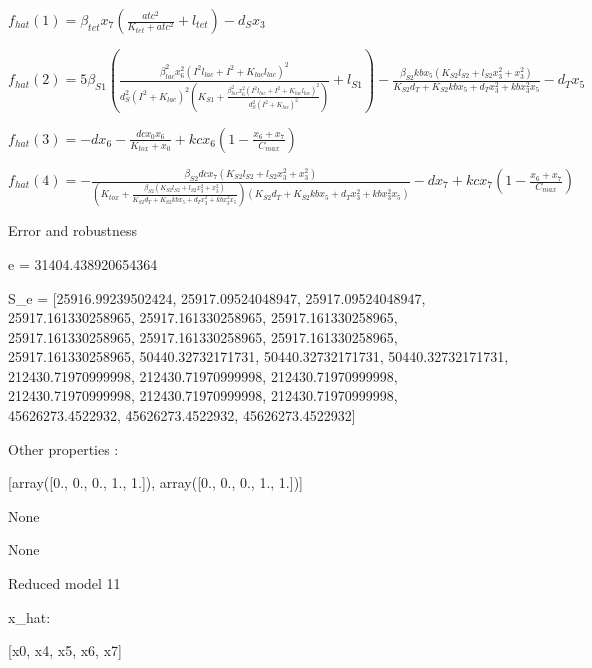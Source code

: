 $f_{hat}(1)=\beta_{tet} x_{7} \left(\frac{atc^{2}}{K_{tet} + atc^{2}} + l_{tet}\right) - d_{S} x_{3}$


$f_{hat}(2)=5 \beta_{S1} \left(\frac{\beta_{lac}^{2} x_{6}^{2} \left(I^{2} l_{lac} + I^{2} + K_{lac} l_{lac}\right)^{2}}{d_{S}^{2} \left(I^{2} + K_{lac}\right)^{2} \left(K_{S1} + \frac{\beta_{lac}^{2} x_{6}^{2} \left(I^{2} l_{lac} + I^{2} + K_{lac} l_{lac}\right)^{2}}{d_{S}^{2} \left(I^{2} + K_{lac}\right)^{2}}\right)} + l_{S1}\right) - \frac{\beta_{S2} kb x_{5} \left(K_{S2} l_{S2} + l_{S2} x_{3}^{2} + x_{3}^{2}\right)}{K_{S2} d_{T} + K_{S2} kb x_{5} + d_{T} x_{3}^{2} + kb x_{3}^{2} x_{5}} - d_{T} x_{5}$


$f_{hat}(3)=- d x_{6} - \frac{dc x_{0} x_{6}}{K_{tox} + x_{0}} + kc x_{6} \left(1 - \frac{x_{6} + x_{7}}{C_{max}}\right)$


$f_{hat}(4)=- \frac{\beta_{S2} dc x_{7} \left(K_{S2} l_{S2} + l_{S2} x_{3}^{2} + x_{3}^{2}\right)}{\left(K_{tox} + \frac{\beta_{S2} \left(K_{S2} l_{S2} + l_{S2} x_{3}^{2} + x_{3}^{2}\right)}{K_{S2} d_{T} + K_{S2} kb x_{5} + d_{T} x_{3}^{2} + kb x_{3}^{2} x_{5}}\right) \left(K_{S2} d_{T} + K_{S2} kb x_{5} + d_{T} x_{3}^{2} + kb x_{3}^{2} x_{5}\right)} - d x_{7} + kc x_{7} \left(1 - \frac{x_{6} + x_{7}}{C_{max}}\right)$



Error and robustness 


e = 31404.438920654364

S_e = [25916.99239502424, 25917.09524048947, 25917.09524048947, 25917.161330258965, 25917.161330258965, 25917.161330258965, 25917.161330258965, 25917.161330258965, 25917.161330258965, 25917.161330258965, 50440.32732171731, 50440.32732171731, 50440.32732171731, 212430.71970999998, 212430.71970999998, 212430.71970999998, 212430.71970999998, 212430.71970999998, 212430.71970999998, 45626273.4522932, 45626273.4522932, 45626273.4522932]

Other properties :


[array([0., 0., 0., 1., 1.]), array([0., 0., 0., 1., 1.])]

None

None

Reduced model 11

x_{hat}: 

[x0, x4, x5, x6, x7]


